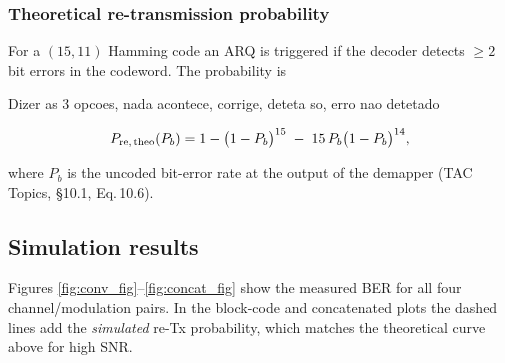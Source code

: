 \begin{comment}
\begin{figure}[h]
\centering
\begin{tikzpicture}[node distance=6mm,>=latex,font=\small]
  \node[draw,rectangle] (src) {ASCII / Huffman};
  \node[draw,rectangle,right=of src] (fec)  {FEC \\ (Conv, Ham, Both)};
  \node[draw,rectangle,right=of fec] (int)  {Interleaver};
  \node[draw,rectangle,right=of int] (map)  {QPSK / 16-QAM \\ + OFDM};
  \node[draw,rectangle,right=of map] (chan) {AWGN / Rayleigh};
  \node[draw,rectangle,right=of chan] (dmap){Demap \\+ FFT};
  \node[draw,rectangle,right=of dmap] (dint){De-interleaver};
  \node[draw,rectangle,right=of dint] (dfec){FEC Decoder};
  \node[draw,rectangle,right=of dfec] (sink){ASCII / Huffman Decode};
  \draw[->] (src)--(fec)--(int)--(map)--(chan)--(dmap)--(dint)--(dfec)--(sink);
\end{tikzpicture}
\caption{End-to-end block diagram used in Phase II.}
\label{fig:sys_block_diag}
\end{figure}

\end{comment}
\subsubsection{Theoretical re-transmission probability}

For a $(15,11)$ Hamming code an ARQ is triggered if the decoder
detects \(\ge 2\) bit errors in the codeword.  The probability is

Dizer as 3 opcoes, nada acontece, corrige, deteta so, erro nao detetado

\[
P_{\text{re,\,theo}}(P_b) =
1 - \bigl(1-P_b\bigr)^{15}
    \;-\;
    15\,P_b\bigl(1-P_b\bigr)^{14},
\]

where \(P_b\) is the uncoded bit-error rate at the output of the
demapper (TAC Topics, §10.1, Eq.\,10.6).

\subsection{Simulation results}

Figures \ref{fig:conv_fig}–\ref{fig:concat_fig} show the measured BER
for all four channel/modulation pairs.  In the block-code and
concatenated plots the dashed lines add the \emph{simulated} re-Tx
probability, which matches the theoretical curve above for
high SNR.


